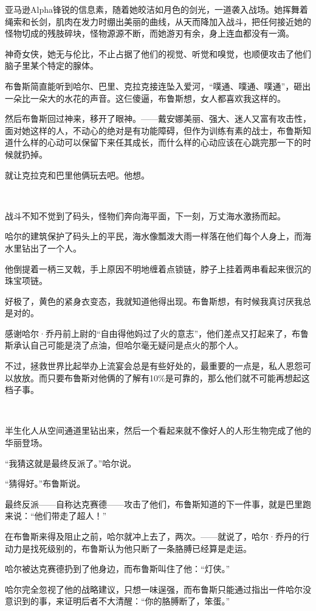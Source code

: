 \documentclass[../main]{subfiles}
\begin{document}
亚马逊Alpha锋锐的信息素，随着她皎洁如月色的剑光，一道袭入战场。她挥舞着绳索和长剑，肌肉在发力时绷出美丽的曲线，从天而降加入战斗，把任何接近她的怪物切成的残肢碎块，怪物源源不断，而她游刃有余，身上连血都没有一滴。

神奇女侠，她无与伦比，不止占据了他们的视觉、听觉和嗅觉，也顺便攻击了他们脑子里某个特定的腺体。

布鲁斯简直能听到哈尔、巴里、克拉克接连坠入爱河，“噗通、噗通、噗通”，砸出一朵比一朵大的水花的声音。这仨傻逼，布鲁斯想，女人都喜欢我这样的。

然后布鲁斯回过神来，移开了眼神。——戴安娜美丽、强大、迷人又富有攻击性，面对她这样的人，不动心的绝对是有功能障碍，但作为训练有素的战士，布鲁斯知道什么样的心动可以保留下来任其成长，而什么样的心动应该在心跳完那一下的时候就扔掉。

就让克拉克和巴里他俩玩去吧。他想。

~\

战斗不知不觉到了码头，怪物们奔向海平面，下一刻，万丈海水激扬而起。

哈尔的建筑保护了码头上的平民，海水像瓢泼大雨一样落在他们每个人身上，而海水里钻出了一个人。

他倒提着一柄三叉戟，手上原因不明地缠着点锁链，脖子上挂着两串看起来很沉的珠宝项链。

好极了，黄色的紧身衣变态，我就知道他得出现。布鲁斯想，有时候我真讨厌我总是对的。

感谢哈尔·乔丹前上尉的“自由得他妈过了火的意志”，他们差点又打起来了，布鲁斯承认自己可能是浇了点油，但哈尔毫无疑问是点火的那个人。

不过，拯救世界比起举办上流宴会总是有些好处的，最重要的一点是，私人恩怨可以放放。而只要布鲁斯对他俩的了解有10\%是可靠的，那么他们就不可能再想起这档子事。

~\

半生化人从空间通道里钻出来，然后一个看起来就不像好人的人形生物完成了他的华丽登场。

“我猜这就是最终反派了。”哈尔说。

“猜得好。”布鲁斯说。

最终反派——自称达克赛德——攻击了他们，布鲁斯知道的下一件事，就是巴里跑来说：“他们带走了超人！”

在布鲁斯来得及阻止之前，哈尔就冲上去了，两次。——就说了，哈尔·乔丹的行动力是找死级别的，布鲁斯认为他只断了一条胳膊已经算是走运。

哈尔被达克赛德扔到了他身边，而布鲁斯叫住了他：“灯侠。”

哈尔完全忽视了他的战略建议，只想一味逞强，而布鲁斯只能通过指出一件哈尔没意识到的事，来证明后者不大清醒：“你的胳膊断了，笨蛋。”
\end{document}
